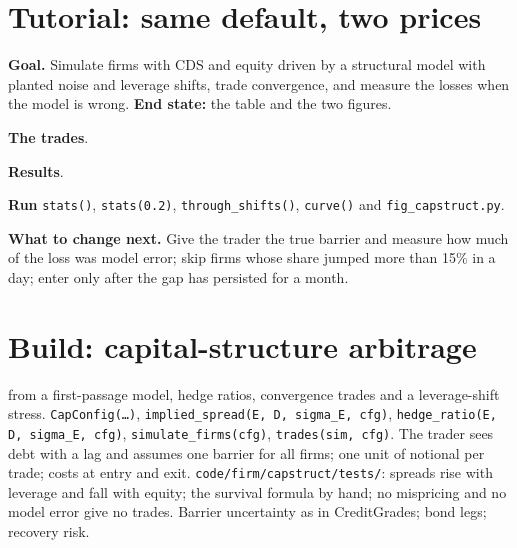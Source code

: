 \section{Tutorial: same default, two prices}\label{tut:s2:capital-structure-arbitrage:tut}

\begin{tutorial}
\textbf{Goal.} Simulate firms with CDS and equity driven by a structural model with planted noise and leverage shifts, trade convergence, and measure
the losses when the model is wrong. \textbf{End state:} the table and the two figures.
\begin{tutsteps}
\item \textbf{The trades}.
\label{lst:s2:capital-structure-arbitrage:trades}
\item \textbf{Results}.
\label{lst:s2:capital-structure-arbitrage:stats}
\item \textbf{Run} \texttt{stats()}, \texttt{stats(0.2)}, \texttt{through\_shifts()}, \texttt{curve()} and \texttt{fig\_capstruct.py}.
\end{tutsteps}
\textbf{What to change next.} Give the trader the true barrier and measure how much of the loss was model error; skip firms whose share jumped more
than 15\% in a day; enter only after the gap has persisted for a month.
\end{tutorial}

\section{Build: capital-structure arbitrage}\label{bld:s2:capital-structure-arbitrage:capstruct}

\begin{build}
  from a first-passage model, hedge ratios, convergence trades and a leverage-shift stress.
 \texttt{CapConfig(\dots)}, \texttt{implied\_spread(E, D, sigma\_E, cfg)}, \texttt{hedge\_ratio(E, D, sigma\_E, cfg)},
\texttt{simulate\_firms(cfg)}, \texttt{trades(sim, cfg)}.
 The trader sees debt with a lag and assumes one barrier for all firms; one unit of notional per trade; costs at entry and exit.
 \texttt{code/firm/capstruct/tests/}: spreads rise with leverage and fall with equity; the survival formula by hand; no
mispricing and no model error give no trades.
 Barrier uncertainty as in CreditGrades; bond legs; recovery risk.
\end{build}

